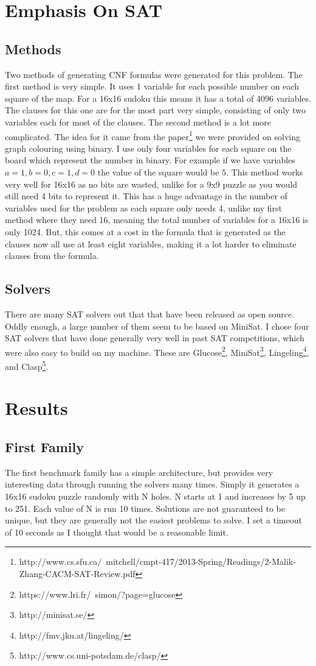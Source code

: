 \documentclass[11pt]{article} %
\begin{document}
\section{Emphasis On SAT}
\subsection{Methods}
Two methods of generating CNF formulas were generated for this problem. The first method is very simple. It uses 1 variable for each possible number on each square of the map. For a 16x16 sudoku this means it has a total of 4096 variables. The clauses for this one are for the most part very simple, consisting of only two variables each for most of the clauses. The second method is a lot more complicated. The idea for it came from the paper\footnote{http://www.cs.sfu.ca/~mitchell/cmpt-417/2013-Spring/Readings/2-Malik-Zhang-CACM-SAT-Review.pdf} we were provided on solving graph colouring using binary. I use only four variables for each square on the board which represent the number in binary. For example if we have variables $a = 1, b = 0, c = 1, d = 0$ the value of the square would be $5$. This method works very well for 16x16 as no bits are wasted, unlike for a 9x9 puzzle as you would still need 4 bits to represent it. This has a huge advantage in the number of variables used for the problem as each square only needs 4, unlike my first method where they need 16, meaning the total number of variables for a 16x16 is only 1024. But, this comes at a cost in the formula that is generated as the clauses now all use at least eight variables, making it a lot harder to eliminate clauses from the formula.
\subsection{Solvers}
There are many SAT solvers out that that have been released as open source.
Oddly enough, a large number of them seem to be based on MiniSat.
I chose four SAT solvers that have done generally very well in past SAT competitions, which were also easy to build on my machine.
These are Glucose\footnote{https://www.lri.fr/~simon/?page=glucose}, MiniSat\footnote{http://minisat.se/}, Lingeling\footnote{http://fmv.jku.at/lingeling/}, and Clasp\footnote{http://www.cs.uni-potsdam.de/clasp/}.

\section{Results}
\subsection{First Family}
The first benchmark family has a simple architecture, but provides very interesting data through running the solvers many times. Simply it generates a 16x16 sudoku puzzle randomly with N holes. N starts at 1 and increases by 5 up to 251. Each value of N is run 10 times. Solutions are not guaranteed to be unique, but they are generally not the easiest problems to solve. I set a timeout of 10 seconds as I thought that would be a reasonable limit.
\end{document}
